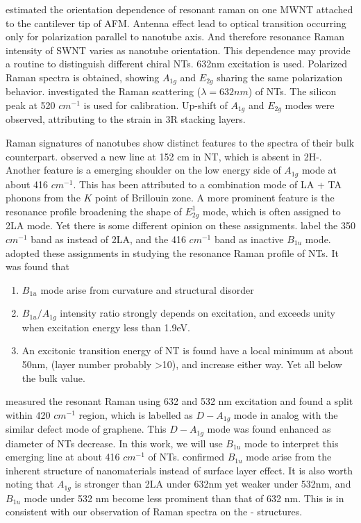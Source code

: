 \citeauthor{Rafailov2005} estimated the orientation dependence of resonant raman on one MWNT  attached to the cantilever tip of AFM.\cite{Rafailov2005} Antenna effect lead to optical transition occurring only for polarization parallel to nanotube axis. And therefore resonance Raman intensity of SWNT varies as nanotube orientation. This dependence may provide a routine to distinguish different chiral NTs. 632nm excitation is used. Polarized Raman spectra is obtained, showing $A_{1g}$ and $E_{2g}$ sharing the same polarization behavior. \citeauthor{Virsek2007} investigated the Raman scattering ($\lambda=632nm$) of  NTs.\cite{Virsek2007} The silicon peak at 520 $cm^{-1}$ is used for calibration. Up-shift of $A_{1g}$ and $E_{2g}$ modes were observed, attributing to the strain in 3R stacking layers.

Raman signatures of  nanotubes show distinct features to the spectra of their bulk counterpart. \citeauthor{JMR7990865} observed a new line at 152 cm in  NT, which is absent in 2H-.\cite{JMR7990865} Another feature is a emerging shoulder on the low energy side of $A_{1g}$ mode at about 416 $cm^{-1}$. This has been attributed to a combination mode of LA + TA phonons from the $K$ point of Brillouin zone.\cite{Sourisseau1991} A more prominent feature is the resonance profile broadening the shape of $E_{2g}^1$ mode, which is often assigned to 2LA mode. Yet there is some different opinion on these assignments. \citeauthor{Molina-Sanchez2011} label the 350 $cm^{-1}$ band as  instead of 2LA, and the 416 $cm^{-1}$ band as inactive $B_{1u}$ mode.\cite{Molina-Sanchez2011} \citeauthor{Staiger2012} adopted these assignments in studying the resonance Raman profile of  NTs.\cite{Staiger2012} It was found that
\begin{enumerate}
\item $B_{1u}$ mode arise from curvature and structural disorder
\item $B_{1u}/A_{1g}$ intensity ratio strongly depends on excitation, and exceeds unity when excitation energy less than 1.9eV.
\item  An excitonic transition energy of NT is found have a local minimum at about 50nm, (layer number probably \textgreater 10), and increase either way. Yet all below the bulk value.
\end{enumerate}

\citeauthor{Krause2009} measured the resonant Raman using 632 and 532 nm excitation and found a split within 420 $cm^{-1}$ region, which is labelled as $D-A_{1g}$ mode in analog with the similar defect mode of graphene.\cite{Krause2009} This  $D-A_{1g}$ mode was found enhanced as diameter of  NTs decrease. In this work, we will use $B_{1u}$ mode to interpret this emerging line at about 416 $cm^{-1}$ of  NTs. \citeauthor{Krause2009a} confirmed $B_{1u}$ mode arise from the inherent structure of  nanomaterials instead of surface layer effect. It is also worth noting that $A_{1g}$ is stronger than 2LA under 632nm yet weaker under 532nm, and $B_{1u}$ mode under 532 nm become less prominent than that of 632 nm.\cite{Krause2009a} This is in consistent with our observation of Raman spectra on the - structures.


